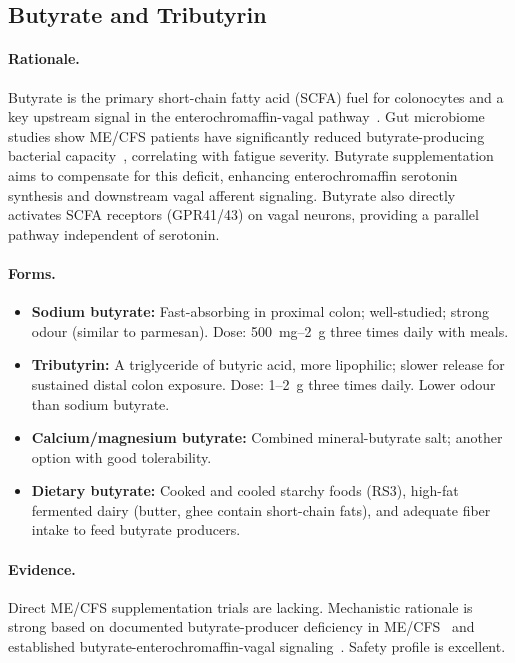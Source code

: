 \subsection{Butyrate and Tributyrin}
\label{subsec:butyrate}

\paragraph{Rationale.} Butyrate is the primary short-chain fatty acid (SCFA) fuel for colonocytes and a key upstream signal in the enterochromaffin-vagal pathway~\cite{Barton2025, WirthScheibenbogen2025Neurotransmitter}. Gut microbiome studies show ME/CFS patients have significantly reduced butyrate-producing bacterial capacity~\cite{ButyrateDeficiency2023}, correlating with fatigue severity. Butyrate supplementation aims to compensate for this deficit, enhancing enterochromaffin serotonin synthesis and downstream vagal afferent signaling. Butyrate also directly activates SCFA receptors (GPR41/43) on vagal neurons, providing a parallel pathway independent of serotonin.

\paragraph{Forms.}
\begin{itemize}
    \item \textbf{Sodium butyrate:} Fast-absorbing in proximal colon; well-studied; strong odour (similar to parmesan). Dose: 500~mg--2~g three times daily with meals.
    \item \textbf{Tributyrin:} A triglyceride of butyric acid, more lipophilic; slower release for sustained distal colon exposure. Dose: 1--2~g three times daily. Lower odour than sodium butyrate.
    \item \textbf{Calcium/magnesium butyrate:} Combined mineral-butyrate salt; another option with good tolerability.
    \item \textbf{Dietary butyrate:} Cooked and cooled starchy foods (RS3), high-fat fermented dairy (butter, ghee contain short-chain fats), and adequate fiber intake to feed butyrate producers.
\end{itemize}

\paragraph{Evidence.} Direct ME/CFS supplementation trials are lacking. Mechanistic rationale is strong based on documented butyrate-producer deficiency in ME/CFS~\cite{ButyrateDeficiency2023} and established butyrate-enterochromaffin-vagal signaling~\cite{Barton2025}. Safety profile is excellent.

